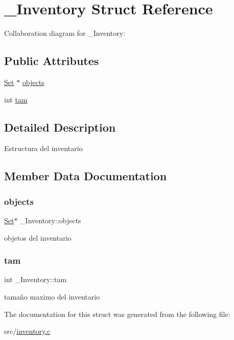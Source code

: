 \hypertarget{struct__Inventory}{}\section{\+\_\+\+Inventory Struct Reference}
\label{struct__Inventory}


Collaboration diagram for \+\_\+\+Inventory\+:
\subsection*{Public Attributes}
\begin{DoxyCompactItemize}
\item 
\hyperlink{set_8h_a6d3b7f7c92cbb4577ef3ef7ddbf93161}{Set} $\ast$ \hyperlink{struct__Inventory_a478e4b50a62b9e7d5b17e335319faa97}{objects}
\item 
int \hyperlink{struct__Inventory_ae6dad9356e59d5e9ce48b09861be1516}{tam}
\end{DoxyCompactItemize}


\subsection{Detailed Description}
Estructura del inventario 

\subsection{Member Data Documentation}
\mbox{\label{struct__Inventory_a478e4b50a62b9e7d5b17e335319faa97}} 
\subsubsection{\texorpdfstring{objects}{objects}}
{\footnotesize\ttfamily \hyperlink{set_8h_a6d3b7f7c92cbb4577ef3ef7ddbf93161}{Set}$\ast$ \+\_\+\+Inventory\+::objects}

objetos del inventario \mbox{\label{struct__Inventory_ae6dad9356e59d5e9ce48b09861be1516}} 
\subsubsection{\texorpdfstring{tam}{tam}}
{\footnotesize\ttfamily int \+\_\+\+Inventory\+::tam}

tamaño maximo del inventario 

The documentation for this struct was generated from the following file\+:\begin{DoxyCompactItemize}
\item 
src/\hyperlink{inventory_8c}{inventory.\+c}\end{DoxyCompactItemize}
